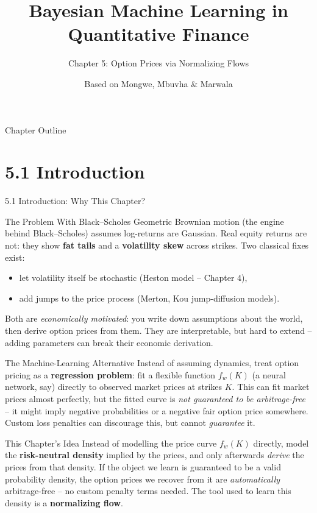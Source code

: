 \documentclass[aspectratio=169,10pt]{beamer}
\title[Bayesian ML in QF -- Ch.5]{Bayesian Machine Learning in Quantitative Finance}
\subtitle{Chapter 5: Option Prices via Normalizing Flows}
\author{Based on Mongwe, Mbuvha \& Marwala}
\date{}
\begin{document}
\begin{frame}
  \titlepage
\end{frame}

\begin{frame}{Chapter Outline}
  \tableofcontents
\end{frame}

\section{5.1 Introduction}
\begin{frame}[allowframebreaks]{5.1 Introduction: Why This Chapter?}

\begin{block}{The Problem With Black--Scholes}
Geometric Brownian motion (the engine behind Black--Scholes) assumes log-returns
are Gaussian. Real equity returns are not: they show \textbf{fat tails} and a
\textbf{volatility skew} across strikes. Two classical fixes exist:
\begin{itemize}
  \item let volatility itself be stochastic (Heston model -- Chapter 4),
  \item add jumps to the price process (Merton, Kou jump-diffusion models).
\end{itemize}
Both are \emph{economically motivated}: you write down assumptions about the
world, then derive option prices from them. They are interpretable, but hard
to extend -- adding parameters can break their economic derivation.
\end{block}

\begin{block}{The Machine-Learning Alternative}
Instead of assuming dynamics, treat option pricing as a \textbf{regression
problem}: fit a flexible function $f_w(K)$ (a neural network, say) directly to
observed market prices at strikes $K$. This can fit market prices almost
perfectly, but the fitted curve is \emph{not guaranteed to be arbitrage-free} --
it might imply negative probabilities or a negative fair option price
somewhere. Custom loss penalties can discourage this, but cannot
\emph{guarantee} it.
\end{block}

\framebreak

\begin{block}{This Chapter's Idea}
Instead of modelling the price curve $f_w(K)$ directly, model the
\textbf{risk-neutral density} implied by the prices, and only afterwards
\emph{derive} the prices from that density. If the object we learn is
guaranteed to be a valid probability density, the option prices we recover
from it are \emph{automatically} arbitrage-free -- no custom penalty terms
needed. The tool used to learn this density is a \textbf{normalizing flow}.
\end{block}


\end{frame}
\end{document}
